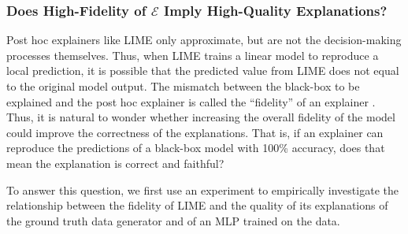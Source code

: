 \documentclass[mnsc,blindrev]{informs3}
\begin{document}
\subsubsection{Does High-Fidelity of $\mathcal{E}$ Imply High-Quality Explanations?} 
\label{sec:e_fidelity}
    Post hoc explainers like LIME only approximate, but are not the decision-making processes themselves. Thus, when LIME trains a linear model to reproduce a local prediction, it is possible that the predicted value from LIME does not equal to the original model output. The mismatch between the black-box to be explained and the post hoc explainer is called the ``fidelity'' of an explainer \cite{laugel18defining}. Thus, it is natural to wonder whether increasing the overall fidelity of the model could improve the correctness of the explanations. That is, if an explainer can reproduce the predictions of a black-box model with 100\% accuracy, does that mean the explanation is correct and faithful?

            To answer this question, we first use an experiment to empirically investigate the relationship between the fidelity of LIME and the quality of its explanations of the ground truth data generator and of an MLP trained on the data.
            
\end{document}
